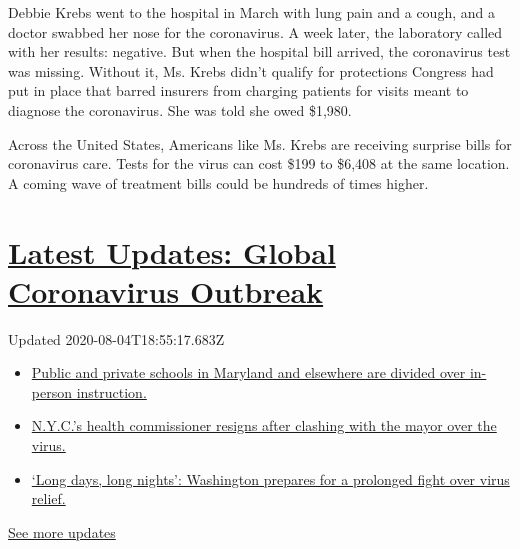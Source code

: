 Debbie Krebs went to the hospital in March with lung pain and a cough,
and a doctor swabbed her nose for the coronavirus. A week later, the
laboratory called with her results: negative. But when the hospital bill
arrived, the coronavirus test was missing. Without it, Ms. Krebs didn't
qualify for protections Congress had put in place that barred insurers
from charging patients for visits meant to diagnose the coronavirus. She
was told she owed \$1,980.

Across the United States, Americans like Ms. Krebs are receiving
surprise bills for coronavirus care. Tests for the virus can cost \$199
to \$6,408 at the same location. A coming wave of treatment bills could
be hundreds of times higher.

\hypertarget{latest-updates-global-coronavirus-outbreak}{%
\section{\texorpdfstring{\href{https://www.nytimes.com/2020/08/04/world/coronavirus-cases.html?action=click\&pgtype=Article\&state=default\&region=MAIN_CONTENT_1\&context=storylines_live_updates}{Latest
Updates: Global Coronavirus
Outbreak}}{Latest Updates: Global Coronavirus Outbreak}}\label{latest-updates-global-coronavirus-outbreak}}

Updated 2020-08-04T18:55:17.683Z

\begin{itemize}
\tightlist
\item
  \href{https://www.nytimes.com/2020/08/04/world/coronavirus-cases.html?action=click\&pgtype=Article\&state=default\&region=MAIN_CONTENT_1\&context=storylines_live_updates\#link-4825b93}{Public
  and private schools in Maryland and elsewhere are divided over
  in-person instruction.}
\item
  \href{https://www.nytimes.com/2020/08/04/world/coronavirus-cases.html?action=click\&pgtype=Article\&state=default\&region=MAIN_CONTENT_1\&context=storylines_live_updates\#link-4d1eafa8}{N.Y.C.'s
  health commissioner resigns after clashing with the mayor over the
  virus.}
\item
  \href{https://www.nytimes.com/2020/08/04/world/coronavirus-cases.html?action=click\&pgtype=Article\&state=default\&region=MAIN_CONTENT_1\&context=storylines_live_updates\#link-6b644638}{`Long
  days, long nights': Washington prepares for a prolonged fight over
  virus relief.}
\end{itemize}

\href{https://www.nytimes.com/2020/08/04/world/coronavirus-cases.html?action=click\&pgtype=Article\&state=default\&region=MAIN_CONTENT_1\&context=storylines_live_updates}{See
more updates}

